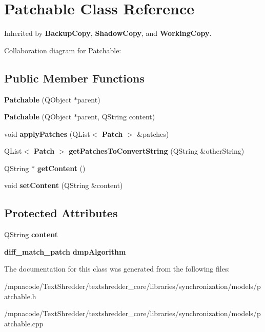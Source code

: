 \section{Patchable Class Reference}
\label{class_patchable}


Inherited by {\bf BackupCopy}, {\bf ShadowCopy}, and {\bf WorkingCopy}.



Collaboration diagram for Patchable:
\subsection*{Public Member Functions}
\begin{DoxyCompactItemize}
\item 
{\bfseries Patchable} (QObject $\ast$parent)\label{class_patchable_a2b2d8a1b4243442461055aa68fe9af18}

\item 
{\bfseries Patchable} (QObject $\ast$parent, QString content)\label{class_patchable_a746675deed66e1b1aed3a7760d6427d6}

\item 
void {\bfseries applyPatches} (QList$<$ {\bf Patch} $>$ \&patches)\label{class_patchable_a38e7876689db45f8e3a45d65ccdc6009}

\item 
QList$<$ {\bf Patch} $>$ {\bfseries getPatchesToConvertString} (QString \&otherString)\label{class_patchable_ab3016a99f60b10bae143365fb2cf1450}

\item 
QString $\ast$ {\bfseries getContent} ()\label{class_patchable_a5abdd9e99d4ab7287cd1f47b23294bea}

\item 
void {\bfseries setContent} (QString \&content)\label{class_patchable_aa386892c91c1718cd5151ccc491e1bbf}

\end{DoxyCompactItemize}
\subsection*{Protected Attributes}
\begin{DoxyCompactItemize}
\item 
QString {\bfseries content}\label{class_patchable_a4c55c830faef821364995f097c96d34d}

\item 
{\bf diff\_\-match\_\-patch} {\bfseries dmpAlgorithm}\label{class_patchable_a3fd21cfdd40012979695e7aefe76558b}

\end{DoxyCompactItemize}


The documentation for this class was generated from the following files:\begin{DoxyCompactItemize}
\item 
/mpnacode/TextShredder/textshredder\_\-core/libraries/synchronization/models/patchable.h\item 
/mpnacode/TextShredder/textshredder\_\-core/libraries/synchronization/models/patchable.cpp\end{DoxyCompactItemize}
